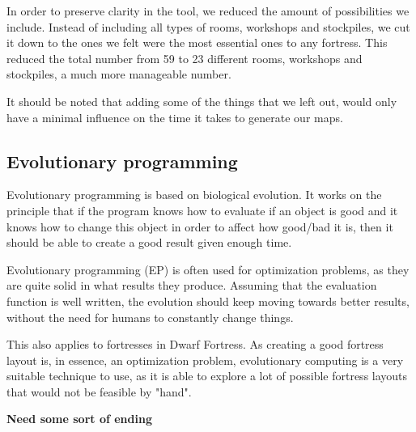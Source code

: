 In order to preserve clarity in the tool, we reduced the amount of possibilities we include. Instead of including all types of rooms, workshops and stockpiles, we cut it down to the ones we felt were the most essential ones to any fortress. This reduced the total number from 59 to 23 different rooms, workshops and stockpiles, a much more manageable number.

It should be noted that adding some of the things that we left out, would only have a minimal influence on the time it takes to generate our maps.


\subsection{Evolutionary programming}
\label{02_Evolution}

Evolutionary programming\cite[Chapter 2]{IoEC} is based on biological evolution. It works on the principle that if the program knows how to evaluate if an object is good and it knows how to change this object in order to affect how good/bad it is, then it should be able to create a good result given enough time.

Evolutionary programming (EP) is often used for optimization problems, as they are quite solid in what results they produce. Assuming that the evaluation function is well written, the evolution should keep moving towards better results, without the need for humans to constantly change things.

This also applies to fortresses in Dwarf Fortress. As creating a good fortress layout is, in essence, an optimization problem, evolutionary computing is a very suitable technique to use, as it is able to explore a lot of possible fortress layouts that would not be feasible by "hand".

\textbf{Need some sort of ending}



